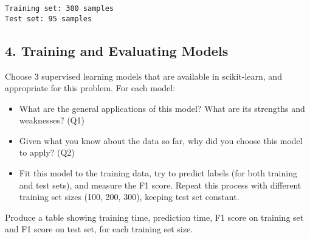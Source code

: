 \documentclass{article}
\providecommand{\tightlist}{%
      \setlength{\itemsep}{0pt}\setlength{\parskip}{0pt}}
\begin{document}
    \begin{Verbatim}[commandchars=\\\{\}]
Training set: 300 samples
Test set: 95 samples
    \end{Verbatim}

    \subsection{4. Training and Evaluating
Models}\label{training-and-evaluating-models}

Choose 3 supervised learning models that are available in scikit-learn,
and appropriate for this problem. For each model:

\begin{itemize}
\tightlist
\item
  What are the general applications of this model? What are its
  strengths and weaknesses? (Q1)
\item
  Given what you know about the data so far, why did you choose this
  model to apply? (Q2)
\item
  Fit this model to the training data, try to predict labels (for both
  training and test sets), and measure the F1 score. Repeat this process
  with different training set sizes (100, 200, 300), keeping test set
  constant.
\end{itemize}

Produce a table showing training time, prediction time, F1 score on
training set and F1 score on test set, for each training set size.
\end{document}
